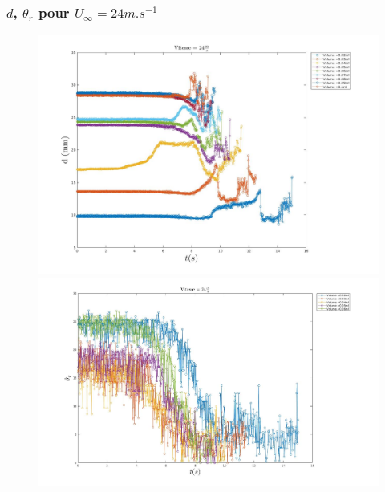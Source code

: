 \documentclass{beamer}
\begin{document}
\begin{frame}
	\frametitle{$d$, $\theta_{r}$ pour $U_{\infty}=24m.s^{-1}$}
\begin{figure}[!ht]
	\centering
	\begin{minipage}{0.5\linewidth}
		\includegraphics[width = \linewidth]{./image/v=24d.jpg}
	\end{minipage}
	\vfill
	\begin{minipage}{0.5\linewidth}
	\includegraphics[width = \linewidth]{./image/v=24or_2.jpg}
	\end{minipage}
\end{figure}
\end{frame}
\end{document}
